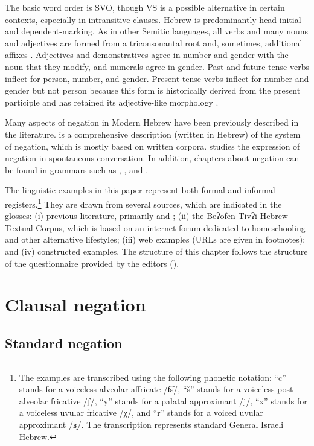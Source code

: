 \documentclass[output=paper,colorlinks,citecolor=brown]{langscibook}
\begin{document}
The basic word order is SVO, though VS is a possible alternative in certain contexts, especially in intransitive clauses. Hebrew is predominantly head-initial and dependent-marking. As in other Semitic languages, all verbs and many nouns and adjectives are formed from a triconsonantal root and, sometimes, additional affixes \citep[317]{Berman1997}. Adjectives and demonstratives agree in number and gender with the noun that they modify, and numerals agree in gender. Past and future tense verbs inflect for person, number, and gender. Present tense verbs inflect for number and gender but not person because this form is historically derived from the present participle and has retained its adjective-like morphology \citep[205]{Tzivoni1993}.

Many aspects of negation in Modern Hebrew have been previously described in the literature. \citet{Tzivoni1993} is a comprehensive description (written in Hebrew) of the system of negation, which is mostly based on written corpora. \citet{Shor2020} studies the expression of negation in spontaneous conversation. In addition, chapters about negation can be found in grammars such as \citet[293--307]{Glinert1989}, \citet[225--230]{Rosén1977}, and \citet[145--146, 220--224]{Berman1978}.

The linguistic examples in this paper represent both formal and informal registers.\footnote{The examples are transcribed using the following phonetic notation: “c” stands for a voiceless alveolar affricate /t͡s/, “š” stands for a voiceless post-alveolar fricative /ʃ/, “y” stands for a palatal approximant /j/, “x” stands for a voiceless uvular fricative /χ/, and “r” stands for a voiced uvular approximant /ʁ̝/. The transcription represents standard General Israeli Hebrew.} They are drawn from several sources, which are indicated in the glosses: (i) previous literature, primarily \citet{Tzivoni1993} and \citet{Glinert1989}; (ii) the Beʔofen Tivʔi Hebrew Textual Corpus, which is based on an internet forum dedicated to homeschooling and other alternative lifestyles; (iii) web examples (URLs are given in footnotes); and (iv) constructed examples. The structure of this chapter follows the structure of the questionnaire provided by the editors ().

\section{Clausal negation} \label{sec:heb:2}
\subsection{Standard negation} \label{sec:heb:2.1}
\end{document}
